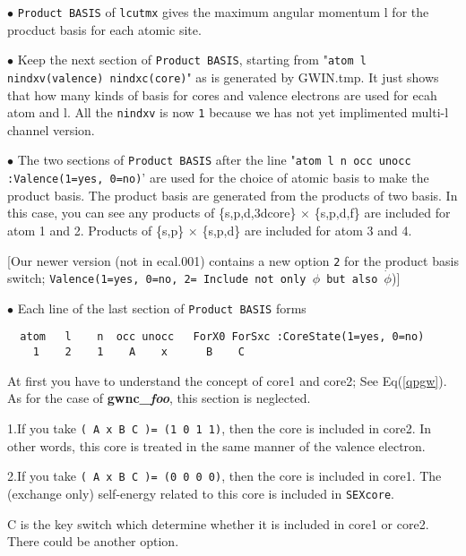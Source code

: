 \documentclass[a4paper,10pt,epsf,fleqn]{article}
\begin{document}
{\vspace{5mm}
\noindent $\bullet$ {\tt Product BASIS} of {\tt lcutmx} gives
the maximum angular momentum l for the procduct basis for each atomic site.

\vspace{5mm}
\noindent $\bullet$ Keep the next section of {\tt Product BASIS},
starting from 
"{\tt   atom   l  nindxv(valence)  nindxc(core)}"
as is generated by GWIN.tmp.
It just shows that how many kinds of basis for cores and valence electrons are used
for ecah atom and l. All the {\tt nindxv} is now {\tt 1} 
because we has not yet implimented multi-l channel version.

\vspace{5mm}
\noindent $\bullet$ The two sections of {\tt Product BASIS} after the line
"{\tt   atom   l    n  occ  unocc  :Valence(1=yes, 0=no)}'
are used for the choice of atomic basis to make the product basis.
The product basis are generated from the products of two basis.
In this case, you can see any products of \{s,p,d,3dcore\} $\times$ \{s,p,d,f\}
are included for atom 1 and 2.  Products of \{s,p\} $\times$ \{s,p,d\} are
included for atom 3 and 4.

[Our newer version (not in ecal.001) contains a new option {\tt 2} for the product basis switch;
{\tt Valence(1=yes, 0=no, 2= Include not only $\phi$ but also $\dot{\phi}$})]

\vspace{5mm}
\noindent $\bullet$ Each line of the last section of {\tt Product BASIS} forms
{\baselineskip=2.6mm
\begin{verbatim}
  atom   l    n  occ unocc   ForX0 ForSxc :CoreState(1=yes, 0=no)
    1    2    1    A    x      B    C
\end{verbatim}}

At first you have to understand the concept of core1 and core2; See Eq(\ref{qpgw}).
As for the case of {\bf gwnc\_{\it foo}}, this section is neglected.

\noindent 1.If you take 
{\tt ( A  x   B    C )= (1 0 1 1)},
then the core is included in core2. In other words, this core is treated in the same 
manner of the valence electron.

\noindent 2.If you take
{\tt ( A  x   B    C )= (0 0 0 0)},
then the core is included in core1.
The (exchange only) self-energy related to this core is included in {\tt SEXcore}.

C is the key switch which determine whether it is included in core1 or core2.
There could be another option.

}
\end{document}
